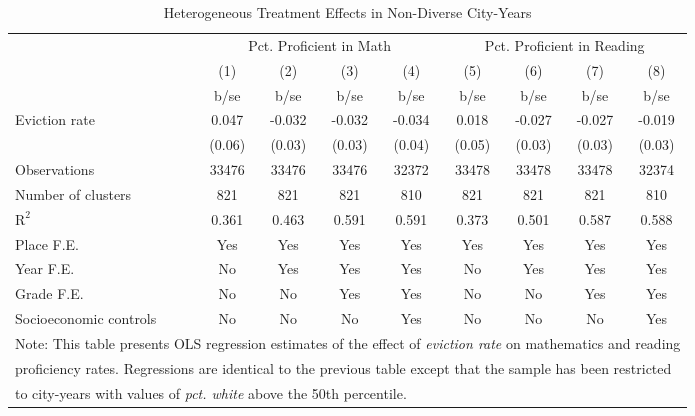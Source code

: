 \begin{table}[htbp]\centering
\def\sym#1{\ifmmode^{#1}\else\(^{#1}\)\fi}
\caption{Heterogeneous Treatment Effects in Non-Diverse City-Years}
\begin{tabular}{l*{8}{c}}
\toprule
                    &\multicolumn{4}{c}{Pct. Proficient in Math}        &\multicolumn{4}{c}{Pct. Proficient in Reading}     \\\cmidrule(lr){2-5}\cmidrule(lr){6-9}
                    &\multicolumn{1}{c}{(1)}&\multicolumn{1}{c}{(2)}&\multicolumn{1}{c}{(3)}&\multicolumn{1}{c}{(4)}&\multicolumn{1}{c}{(5)}&\multicolumn{1}{c}{(6)}&\multicolumn{1}{c}{(7)}&\multicolumn{1}{c}{(8)}\\
                    &        b/se&        b/se&        b/se&        b/se&        b/se&        b/se&        b/se&        b/se\\
\midrule
Eviction rate       &       0.047&      -0.032&      -0.032&      -0.034&       0.018&      -0.027&      -0.027&      -0.019\\
                    &      (0.06)&      (0.03)&      (0.03)&      (0.04)&      (0.05)&      (0.03)&      (0.03)&      (0.03)\\
\midrule
Observations        &       33476&       33476&       33476&       32372&       33478&       33478&       33478&       32374\\
Number of clusters  &         821&         821&         821&         810&         821&         821&         821&         810\\
$\text{R}^2$        &       0.361&       0.463&       0.591&       0.591&       0.373&       0.501&       0.587&       0.588\\
Place F.E.          &         Yes&         Yes&         Yes&         Yes&         Yes&         Yes&         Yes&         Yes\\
Year F.E.           &          No&         Yes&         Yes&         Yes&          No&         Yes&         Yes&         Yes\\
Grade F.E.          &          No&          No&         Yes&         Yes&          No&          No&         Yes&         Yes\\
Socioeconomic controls&          No&          No&          No&         Yes&          No&          No&          No&         Yes\\
\bottomrule
\multicolumn{9}{l}{\footnotesize Note: This table presents OLS regression estimates of the effect of \emph{eviction rate} on mathematics and reading}\\
\multicolumn{9}{l}{\footnotesize proficiency rates. Regressions are identical to the previous table except that the sample has been restricted}\\
\multicolumn{9}{l}{\footnotesize to city-years with values of \emph{pct. white} above the 50th percentile.}\\
\end{tabular}
\end{table}
